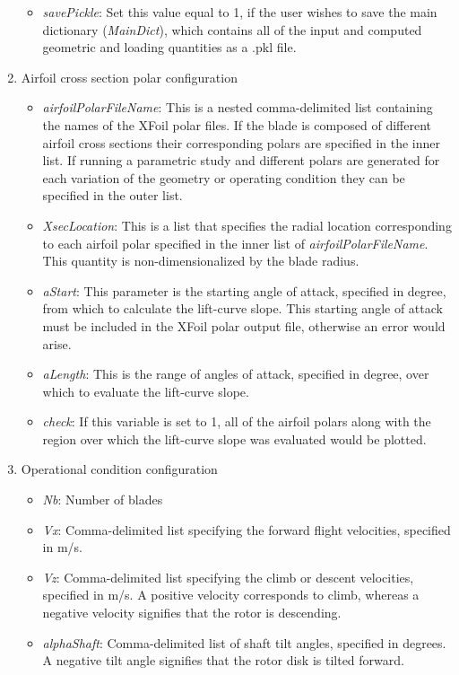 \documentclass[journal ]{new-aiaa}
\begin{document}
\begin{enumerate}
\begin{itemize}
\item \textit{savePickle}: Set this value equal to 1, if the user wishes to save the main dictionary (\textit{MainDict}), which contains all of the input and computed geometric and loading quantities as a .pkl file. 
\end{itemize}
\item Airfoil cross section polar configuration
\begin{itemize}
\item \textit{airfoilPolarFileName}: This is a nested comma-delimited list containing the names of the XFoil polar files. If the blade is composed of different airfoil cross sections their corresponding polars are specified in the inner list. If running a parametric study and different polars are generated for each variation of the geometry or operating condition they can be specified in the outer list. 
\item \textit{XsecLocation}: This is a list that specifies the radial location corresponding to each airfoil polar specified in the inner list of \textit{airfoilPolarFileName}. This quantity is non-dimensionalized by the blade radius.
\item \textit{aStart}: This parameter is the starting angle of attack, specified in degree, from which to calculate the lift-curve slope. This starting angle of attack must be included in the XFoil polar output file, otherwise an error would arise.   
\item \textit{aLength}: This is the range of angles of attack, specified in degree, over which to evaluate the lift-curve slope.
\item \textit{check}: If this variable is set to 1, all of the airfoil polars along with the region over which the lift-curve slope was evaluated would be plotted.  
\end{itemize}
\item Operational condition configuration
\begin{itemize}
\item \textit{Nb}: Number of blades 	
\item \textit{Vx}:	 Comma-delimited list specifying the forward flight velocities, specified in m/s.  
\item \textit{Vz}: Comma-delimited list specifying the climb or descent velocities, specified in m/s. A positive velocity corresponds to climb, whereas a negative velocity signifies that the rotor is descending.  
\item \textit{alphaShaft}: Comma-delimited list of shaft tilt angles, specified in degrees. A negative tilt angle signifies that the rotor disk is tilted forward. 

\end{itemize}
\end{enumerate}
\end{document}
